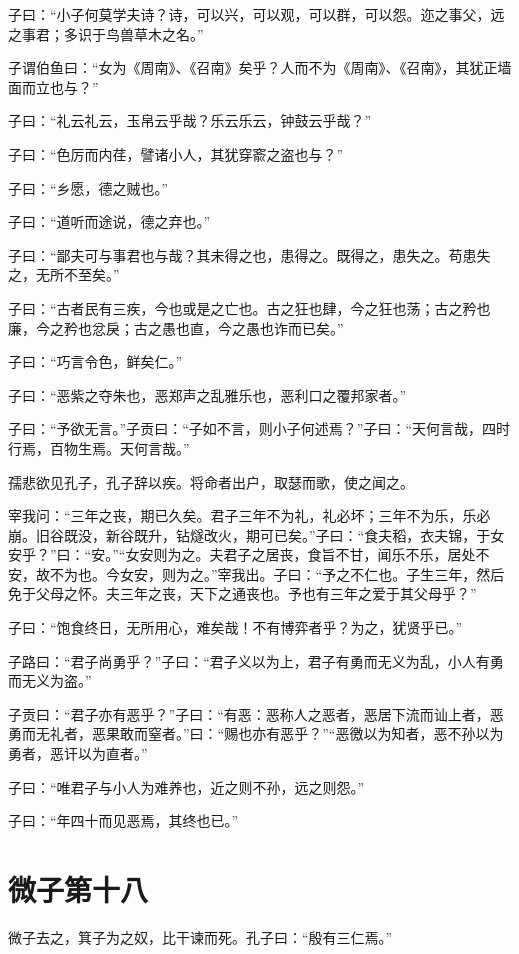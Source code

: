 \documentclass[twoside,openany]{book}
\begin{document}
子曰：“小子何莫学夫诗？诗，可以兴，可以观，可以群，可以怨。迩之事父，远之事君；多识于鸟兽草木之名。”

子谓伯鱼曰：“女为《周南》、《召南》矣乎？人而不为《周南》、《召南》，其犹正墙面而立也与？”

子曰：“礼云礼云，玉帛云乎哉？乐云乐云，钟鼓云乎哉？”

子曰：“色厉而内荏，譬诸小人，其犹穿窬之盗也与？”

子曰：“乡愿，德之贼也。”

子曰：“道听而途说，德之弃也。”

子曰：“鄙夫可与事君也与哉？其未得之也，患得之。既得之，患失之。苟患失之，无所不至矣。”

子曰：“古者民有三疾，今也或是之亡也。古之狂也肆，今之狂也荡；古之矜也廉，今之矜也忿戾；古之愚也直，今之愚也诈而已矣。”

子曰：“巧言令色，鲜矣仁。”

子曰：“恶紫之夺朱也，恶郑声之乱雅乐也，恶利口之覆邦家者。”

子曰：“予欲无言。”子贡曰：“子如不言，则小子何述焉？”子曰：“天何言哉，四时行焉，百物生焉。天何言哉。”

孺悲欲见孔子，孔子辞以疾。将命者出户，取瑟而歌，使之闻之。

宰我问：“三年之丧，期已久矣。君子三年不为礼，礼必坏；三年不为乐，乐必崩。旧谷既没，新谷既升，钻燧改火，期可已矣。”子曰：“食夫稻，衣夫锦，于女安乎？”曰：“安。”“女安则为之。夫君子之居丧，食旨不甘，闻乐不乐，居处不安，故不为也。今女安，则为之。”宰我出。子曰：“予之不仁也。子生三年，然后免于父母之怀。夫三年之丧，天下之通丧也。予也有三年之爱于其父母乎？”

子曰：“饱食终日，无所用心，难矣哉！不有博弈者乎？为之，犹贤乎已。”

子路曰：“君子尚勇乎？”子曰：“君子义以为上，君子有勇而无义为乱，小人有勇而无义为盗。”

子贡曰：“君子亦有恶乎？”子曰：“有恶：恶称人之恶者，恶居下流而讪上者，恶勇而无礼者，恶果敢而窒者。”曰：“赐也亦有恶乎？”“恶徼以为知者，恶不孙以为勇者，恶讦以为直者。”

子曰：“唯君子与小人为难养也，近之则不孙，远之则怨。”

子曰：“年四十而见恶焉，其终也已。”


\chapter{微子第十八}\label{ch18}



微子去之，箕子为之奴，比干谏而死。孔子曰：“殷有三仁焉。”
\end{document}
